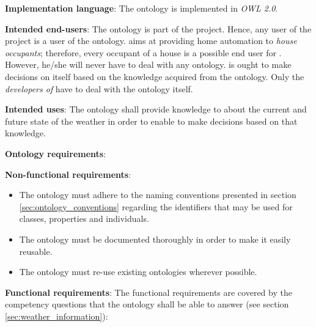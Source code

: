 \begin{mdframed}[linewidth=.6pt]
\vspace{.2cm}

\textbf{Implementation language}: The ontology is implemented in \emph{OWL 2.0}\cite{OWL}.

\vspace{.2cm}

\textbf{Intended end-users}: The ontology is part of the \thinkhome project. Hence, any user of the \thinkhome project is a user of the \thinkhomeweather ontology. \thinkhome aims at providing home automation to \emph{house occupants}; therefore, every occupant of a house is a possible end user for \thinkhomeweather. However, he/she will never have to deal with any ontology. \thinkhome is ought to make decisions on itself based on the knowledge acquired from the \thinkhomeweather ontology. Only the \emph{developers of \thinkhome} have to deal with the ontology itself.

\vspace{.2cm}

\textbf{Intended uses}: The ontology shall provide knowledge to \thinkhome about the current and future state of the weather in order to enable \thinkhome to make decisions based on that knowledge.

\vspace{.2cm}

\textbf{Ontology requirements}:

\vspace{.2cm}

\setlength{\leftskip}{.5cm}

\textbf{Non-functional requirements}:

\begin{itemize}
  \item The ontology must adhere to the naming conventions presented in section \ref{sec:ontology_conventions} regarding the identifiers that may be used for classes, properties and individuals.
  \item The ontology must be documented thoroughly in order to make it easily reusable.
  \item The ontology must re-use existing ontologies wherever possible.
\end{itemize}

\textbf{Functional requirements}: The functional requirements are covered by the competency questions that the ontology shall be able to answer (see section \ref{sec:weather_information}):


\end{mdframed}
